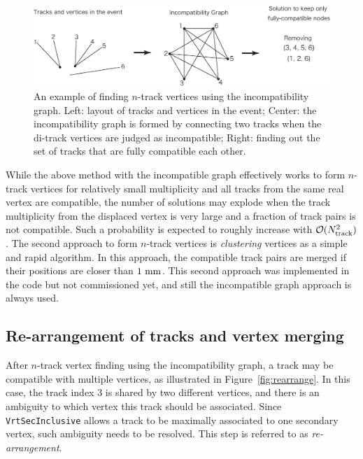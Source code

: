 \documentclass[NOTE, atlasdraft=true, texlive=2018, UKenglish]{\ATLASLATEXPATH atlasdoc}
\begin{document}
\begin{figure}[t]
\begin{center}
\includegraphics[width=1.0\textwidth]{figures/incomp}
\caption{An example of finding $n$-track vertices using the incompatibility graph. Left: layout of tracks and vertices in the event; Center: the incompatibility graph is formed by connecting two tracks when the di-track vertices are judged as incompatible; Right: finding out the set of tracks that are fully compatible each other.}
\label{fig:incomp}
\end{center}
\end{figure}


While the above method with the incompatible graph effectively works to form $n$-track vertices for relatively small multiplicity and all tracks from the same real vertex are compatible, the number of solutions may explode when the track multiplicity from the displaced vertex is very large and a fraction of track pairs is not compatible. Such a probability is expected to roughly increase with ${\cal O}(N_{\rm track}^{2})$. The second approach to form $n$-track vertices is {\it clustering} vertices as a simple and rapid algorithm. In this approach, the compatible track pairs are merged if their positions are closer than $1~{\rm mm}$. This second approach was implemented in the code but not commissioned yet, and still the incompatible graph approach is always used.

\subsection{Re-arrangement of tracks and vertex merging}
After $n$-track vertex finding using the incompatibility graph, a track may be compatible with multiple vertices, as illustrated in Figure~\ref{fig:rearrange}. In this case, the track index 3 is shared by two different vertices, and there is an ambiguity to which vertex this track should be associated. Since {\tt VrtSecInclusive} allows a track to be maximally associated to one secondary vertex, such ambiguity needs to be resolved. This step is referred to as \emph{re-arrangement}.
\end{document}
